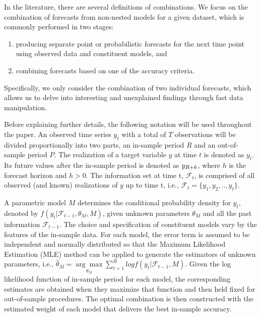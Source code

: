 \documentclass{monashthesis}
\begin{document}
In the literature, there are several definitions of combinations. We focus on the combination of forecasts from non-nested models for a given dataset, which is commonly performed in two stages:

\begin{enumerate}
\def\labelenumi{\arabic{enumi}.}
\item
  producing separate point or probabilistic forecasts for the next time point using observed data and constituent models, and
\item
  combining forecasts based on one of the accuracy criteria.
\end{enumerate}

Specifically, we only consider the combination of two individual forecasts, which allows us to delve into interesting and unexplained findings through fast data manipulation.

Before explaining further details, the following notation will be used throughout the paper. An observed time series \(y_t\) with a total of \(T\) observations will be divided proportionally into two parts, an in-sample period \(R\) and an out-of-sample period \(P\). The realization of a target variable \(y\) at time \(t\) is denoted as \(y_t\). Its future values after the in-sample period is denoted as \(y_{\small{R+h}}\), where \(h\) is the forecast horizon and \(h>0\). The information set at time t, \(\mathcal{F}_t\), is comprised of all observed (and known) realizations of \(y\) up to time t, i.e., \(\mathcal{F}_t = \{y_1, y_2, .., y_t\}\).

A parametric model \(M\) determines the conditional probability density for \(y_t\), denoted by \(f(y_t|\mathcal{F}_{t-1}, \theta_M, M)\), given unknown parameters \(\theta_M\) and all the past information \(\mathcal{F}_{t-1}\). The choice and specification of constituent models vary by the features of the in-sample data. For each model, the error term is assumed to be independent and normally distributed so that the Maximum Likelihood Estimation (MLE) method can be applied to generate the estimators of unknown parameters, i.e., \(\hat\theta_M = \underset{\theta_M}{\arg\max} \sum^R_{t=1} log f(y_t|\mathcal{F}_{t-1}, M)\). Given the log likelihood function of in-sample period for each model, the corresponding estimates are obtained when they maximize that function and then held fixed for out-of-sample procedures. The optimal combination is then constructed with the estimated weight of each model that delivers the best in-sample accuracy.
\end{document}
